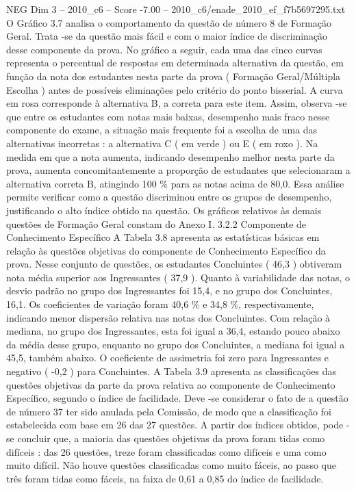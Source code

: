 \begin{textsample}{NEG Dim 3 – 2010\_c6 – Score -7.00 – 2010\_c6/enade\_2010\_ef\_f7b5697295.txt}
O Gráfico 3.7 analisa o comportamento da questão de número 8 de Formação Geral.
Trata -se da questão mais fácil e com o maior índice de discriminação desse componente da prova.
No gráfico a seguir, cada uma das cinco curvas representa o percentual de respostas em determinada alternativa da questão, em função da nota dos estudantes nesta parte da prova ( Formação Geral/Múltipla Escolha ) antes de possíveis eliminações pelo critério do ponto bisserial.
A curva em rosa corresponde à alternativa B, a correta para este item.
Assim, observa -se que entre os estudantes com notas mais baixas, desempenho mais fraco nesse componente do exame, a situação mais frequente foi a escolha de uma das alternativas incorretas : a alternativa C ( em verde ) ou E ( em roxo ).
Na medida em que a nota aumenta, indicando desempenho melhor nesta parte da prova, aumenta concomitantemente a proporção de estudantes que selecionaram a alternativa correta B, atingindo 100 \% para as notas acima de 80,0.
Essa análise permite verificar como a questão discriminou entre os grupos de desempenho, justificando o alto índice obtido na questão.
Os gráficos relativos às demais questões de Formação Geral constam do Anexo I. 3.2.2 Componente de Conhecimento Específico A Tabela 3.8 apresenta as estatísticas básicas em relação às questões objetivas do componente de Conhecimento Específico da prova.
Nesse conjunto de questões, os estudantes Concluintes ( 46,3 ) obtiveram nota média superior aos Ingressantes ( 37,9 ).
Quanto à variabilidade das notas, o desvio padrão no grupo dos Ingressantes foi 15,4, e no grupo dos Concluintes, 16,1.
Os coeficientes de variação foram 40,6 \% e 34,8 \%, respectivamente, indicando menor dispersão relativa nas notas dos Concluintes.
Com relação à mediana, no grupo dos Ingressantes, esta foi igual a 36,4, estando pouco abaixo da média desse grupo, enquanto no grupo dos Concluintes, a mediana foi igual a 45,5, também abaixo.
O coeficiente de assimetria foi zero para Ingressantes e negativo ( -0,2 ) para Concluintes.
A Tabela 3.9 apresenta as classificações das questões objetivas da parte da prova relativa ao componente de Conhecimento Específico, segundo o índice de facilidade.
Deve -se considerar o fato de a questão de número 37 ter sido anulada pela Comissão, de modo que a classificação foi estabelecida com base em 26 das 27 questões.
A partir dos índices obtidos, pode -se concluir que, a maioria das questões objetivas da prova foram tidas como difíceis : das 26 questões, treze foram classificadas como difíceis e uma como muito difícil.
Não houve questões classificadas como muito fáceis, ao passo que três foram tidas como fáceis, na faixa de 0,61 a 0,85 do índice de facilidade.

\end{textsample}
